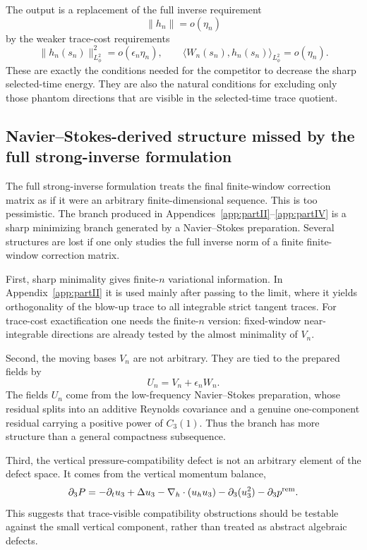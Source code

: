 \documentclass[11pt]{article}
\numberwithin{equation}{section}
\theoremstyle{plain}
\theoremstyle{definition}
\theoremstyle{remark}
\begin{document}
The output is a replacement of the full inverse requirement
\[
        \|h_n\|=o(\eta_n)
\]
by the weaker trace-cost requirements
\[
        \|h_n(s_n)\|_{L^2_\phi}^2=o(\epsilon_n\eta_n),
        \qquad
        \langle W_n(s_n),h_n(s_n)\rangle_{L^2_\phi}=o(\eta_n).
\]
These are exactly the conditions needed for the competitor to decrease the sharp selected-time
energy.  They are also the natural conditions for excluding only those phantom directions that
are visible in the selected-time trace quotient.

\subsection{Navier--Stokes-derived structure missed by the full strong-inverse formulation}
\label{pV:sec:ns-derived-structure-missed}

The full strong-inverse formulation treats the final finite-window correction matrix as if it were an arbitrary finite-dimensional sequence.  This is too pessimistic.  The branch produced in Appendices~\ref{app:partII}--\ref{app:partIV} is a sharp minimizing branch generated by a Navier--Stokes preparation.  Several structures are lost if one only studies the full inverse norm of a finite finite-window correction matrix.

First, sharp minimality gives finite-\(n\) variational information.  In Appendix~\ref{app:partII} it is used mainly after passing to the limit, where it yields orthogonality of the blow-up trace to all integrable strict tangent traces.  For trace-cost exactification one needs the finite-\(n\) version: fixed-window near-integrable directions are already tested by the almost minimality of \(V_n\).

Second, the moving bases \(V_n\) are not arbitrary.  They are tied to the prepared fields by
\[
        U_n=V_n+\epsilon_nW_n.
\]
The fields \(U_n\) come from the low-frequency Navier--Stokes preparation, whose residual splits into an additive Reynolds covariance and a genuine one-component residual carrying a positive power of \(C_3(1)\).  Thus the branch has more structure than a general compactness subsequence.

Third, the vertical pressure-compatibility defect is not an arbitrary element of the defect space.  It comes from the vertical momentum balance,
\[
        \partial_3P
        =-
        \partial_tu_3+
        \Delta u_3-
        \nabla_h\cdot(u_hu_3)-
        \partial_3(u_3^2)-
        \partial_3p^{\rm rem}.
\]
This suggests that trace-visible compatibility obstructions should be testable against the small vertical component, rather than treated as abstract algebraic defects.
\end{document}
